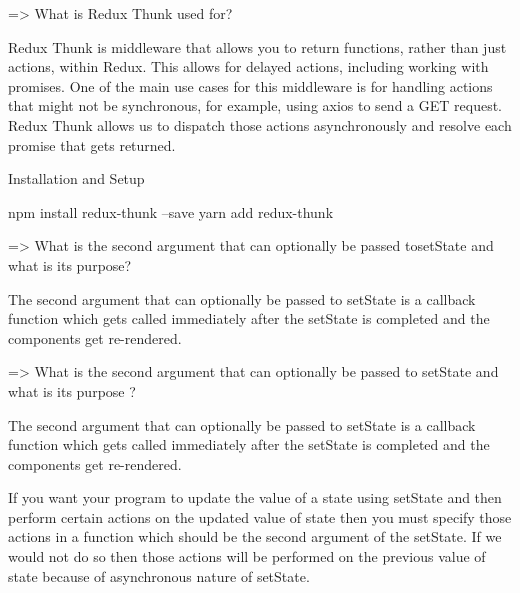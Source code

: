 => What is Redux Thunk used for?

Redux Thunk is middleware that allows you to return functions, 
rather than just actions, within Redux. This allows for delayed actions, 
including working with promises.  One of the main use cases for this 
middleware is for handling actions that might not be synchronous, 
for example, using axios to send a GET request. Redux Thunk allows us 
to dispatch those actions asynchronously and resolve each promise that gets returned.

Installation and Setup

npm install redux-thunk --save 
yarn add redux-thunk 



=> What is the second argument that can optionally be passed tosetState 
and what is its purpose?

The second argument that can optionally be passed to setState is a callback 
function which gets called immediately after the setState is completed and the 
components get re-rendered.

 => What is the second argument that can optionally be passed to setState 
and what is its purpose ?

The second argument that can optionally be passed to setState is a callback function 
which gets called immediately after the setState is completed and the components 
get re-rendered. 

If you want your program to update the value of a state using setState and then 
perform certain actions on the updated value of state then you must specify those 
actions in a function which should be the second argument of the setState. If we 
would not do so then those actions will be performed on the previous value of state 
because of asynchronous nature of setState.